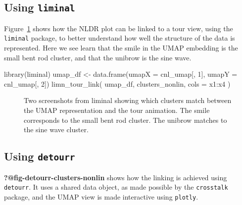 \documentclass[
  letterpaper,
]{krantz}
\newenvironment{Shaded}{\begin{snugshade}}{\end{snugshade}}
\newcommand{\AttributeTok}[1]{\textcolor[rgb]{0.40,0.45,0.13}{#1}}
\newcommand{\DecValTok}[1]{\textcolor[rgb]{0.68,0.00,0.00}{#1}}
\newcommand{\FunctionTok}[1]{\textcolor[rgb]{0.28,0.35,0.67}{#1}}
\newcommand{\NormalTok}[1]{\textcolor[rgb]{0.00,0.23,0.31}{#1}}
\newcommand{\OtherTok}[1]{\textcolor[rgb]{0.00,0.23,0.31}{#1}}
\newcommand{\SpecialCharTok}[1]{\textcolor[rgb]{0.37,0.37,0.37}{#1}}
\begin{document}
\hypertarget{using-liminal}{%
\subsection{\texorpdfstring{Using
\texttt{liminal}}{Using liminal}}\label{using-liminal}}

Figure~\ref{fig-liminal-clusters-nonlin} shows how the NLDR plot can be
linked to a tour view, using the \texttt{liminal} package, to better
understand how well the structure of the data is represented. Here we
see learn that the smile in the UMAP embedding is the small bent rod
cluster, and that the unibrow is the sine wave.

\begin{Shaded}
\begin{Highlighting}[]
\FunctionTok{library}\NormalTok{(liminal)}
\NormalTok{umap\_df }\OtherTok{\textless{}{-}} \FunctionTok{data.frame}\NormalTok{(}\AttributeTok{umapX =}\NormalTok{ cnl\_umap[, }\DecValTok{1}\NormalTok{],}
                      \AttributeTok{umapY =}\NormalTok{ cnl\_umap[, }\DecValTok{2}\NormalTok{])}
\FunctionTok{limn\_tour\_link}\NormalTok{(}
\NormalTok{  umap\_df,}
\NormalTok{  clusters\_nonlin,}
  \AttributeTok{cols =}\NormalTok{ x1}\SpecialCharTok{:}\NormalTok{x4}
\NormalTok{)}
\end{Highlighting}
\end{Shaded}

\begin{figure}

{\centering 

}

\caption{\label{fig-liminal-clusters-nonlin}Two screenshots from liminal
showing which clusters match between the UMAP representation and the
tour animation. The smile corresponds to the small bent rod cluster. The
unibrow matches to the sine wave cluster.}

\end{figure}

\hypertarget{using-detourr}{%
\subsection{\texorpdfstring{Using
\texttt{detourr}}{Using detourr}}\label{using-detourr}}

\textbf{?@fig-detourr-clusters-nonlin} shows how the linking is achieved
using \texttt{detourr}. It uses a shared data object, as made possible
by the \texttt{crosstalk} package, and the UMAP view is made interactive
using \texttt{plotly}.
\end{document}
